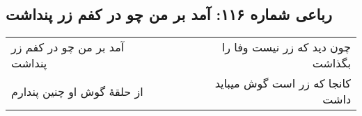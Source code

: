 \begin{center}
\section*{رباعی شماره ۱۱۶: آمد بر من چو در کفم زر پنداشت}
\label{sec:0116}
\begin{longtable}{l p{0.5cm} r}
آمد بر من چو در کفم زر پنداشت
&&
چون دید که زر نیست وفا را بگذاشت
\\
از حلقهٔ گوش او چنین پندارم
&&
کانجا که زر است گوش میباید داشت
\\
\end{longtable}
\end{center}
